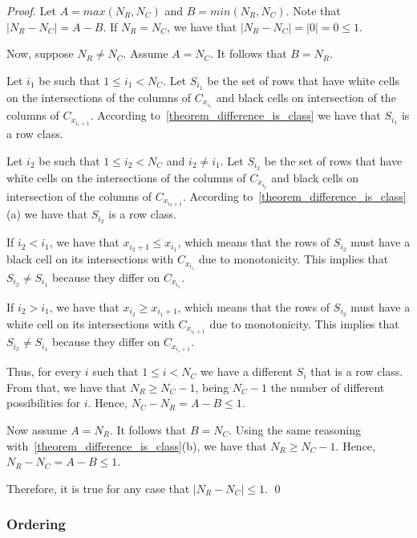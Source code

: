\begin{proof}
Let $A = max(N_{R},N_{C})$ and $B = min(N_{R},N_{C})$. 
Note that $\lvert N_{R} - N_{C} \rvert = A - B$. 
If $N_{R} = N_{C}$, we have that 
$\lvert N_{R} - N_{C}  \rvert = \lvert 0 \rvert = 0 \leq 1$.

Now, suppose $N_{R} \neq N_{C}$. Assume $A = N_{C}$. It follows that $B = N_{R}$. 

Let $i_{1}$ be such that $1 \leq i_{1} < N_{C}$. Let $S_{i_{1}}$ be the set of rows that have white cells on the intersections of the columns of $C_{x_{i_{1}}}$ and black cells on intersection of the columns of $C_{x_{i_{1}+1}}$. According to~\autoref{theorem_difference_is_class} we have that $S_{i_{1}}$ is a row class.

Let $i_{2}$ be such that $1 \leq i_{2} < N_{C}$ and $i_{2} \neq i_{1}$. Let $S_{i_{2}}$ be the set of rows that have white cells on the intersections of the columns of $C_{x_{i_{2}}}$ and black cells on intersection of the columns of $C_{x_{i_{2}+1}}$. According to~\autoref{theorem_difference_is_class}(a) we have that $S_{i_{2}}$ is a row class.

If $i_{2} < i_{1}$, we have that $x_{i_{2}+1} \leq x_{i_{1}}$, which means that the rows of $S_{i_{2}}$ must have a black cell on its intersections with $C_{x_{i_{1}}}$ due to monotonicity. This implies that $S_{i_{2}} \neq S_{i_{1}}$ because they differ on $C_{x_{i_{1}}}$.

If $i_{2} > i_{1}$, we have that $x_{i_{2}} \geq x_{i_{1}+1}$, which means that the rows of $S_{i_{2}}$ must have a white cell on its intersections with $C_{x_{i_{1}+1}}$ due to monotonicity. This implies that $S_{i_{2}} \neq S_{i_{1}}$ because they differ on $C_{x_{i_{1}+1}}$.

Thus, for every $i$ such that $1 \leq i < N_{C}$ we have a different $S_{i}$ that is a row class. From that, we have that $N_{R} \geq N_{C} - 1 $, being $N_{C} - 1$ the number of different possibilities for $i$. Hence, $N_{C} - N_{R} = A - B \leq 1$.

Now assume $A = N_{R}$. It follows that $B = N_{C}$. Using the same reasoning with~\autoref{theorem_difference_is_class}(b), we have that $N_{R} \geq N_{C} - 1$. Hence, $N_{R} - N_{C} = A - B \leq 1$.

Therefore, it is true for any case that $ \lvert N_{R} - N_{C} \rvert \leq 1$.
\qed
\end{proof}



\subsubsection{Ordering}


